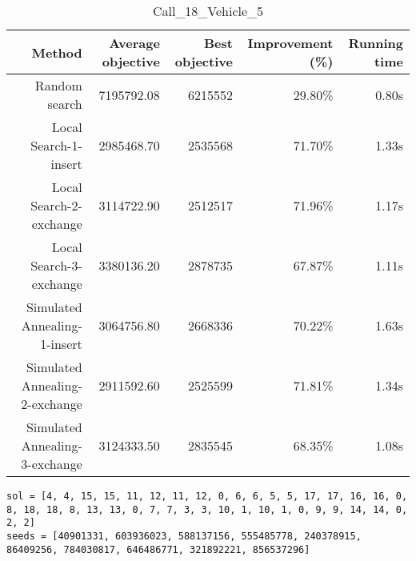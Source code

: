 \begin{table}[ht]
\centering
\caption{Call\_18\_Vehicle\_5}
\label{tab:call18vehicle5}
\begin{tabular}{|r|r|r|r|r|}
Method & Average objective & Best objective & Improvement (\%) & Running time \\
\hline
Random search & 7195792.08 & 6215552 & 29.80\% & 0.80s\\
Local Search-1-insert & 2985468.70 & 2535568 & 71.70\% & 1.33s\\
Local Search-2-exchange & 3114722.90 & 2512517 & 71.96\% & 1.17s\\
Local Search-3-exchange & 3380136.20 & 2878735 & 67.87\% & 1.11s\\
Simulated Annealing-1-insert & 3064756.80 & 2668336 & 70.22\% & 1.63s\\
Simulated Annealing-2-exchange & 2911592.60 & 2525599 & 71.81\% & 1.34s\\
Simulated Annealing-3-exchange & 3124333.50 & 2835545 & 68.35\% & 1.08s\\
\end{tabular}%
\end{table}
\begin{lstlisting}[label={lst:call18vehicle5},caption=Optimal solution call\_18\_vehicle\_5]
sol = [4, 4, 15, 15, 11, 12, 11, 12, 0, 6, 6, 5, 5, 17, 17, 16, 16, 0, 8, 18, 18, 8, 13, 13, 0, 7, 7, 3, 3, 10, 1, 10, 1, 0, 9, 9, 14, 14, 0, 2, 2]
seeds = [40901331, 603936023, 588137156, 555485778, 240378915, 86409256, 784030817, 646486771, 321892221, 856537296]
\end{lstlisting}%
\clearpage


